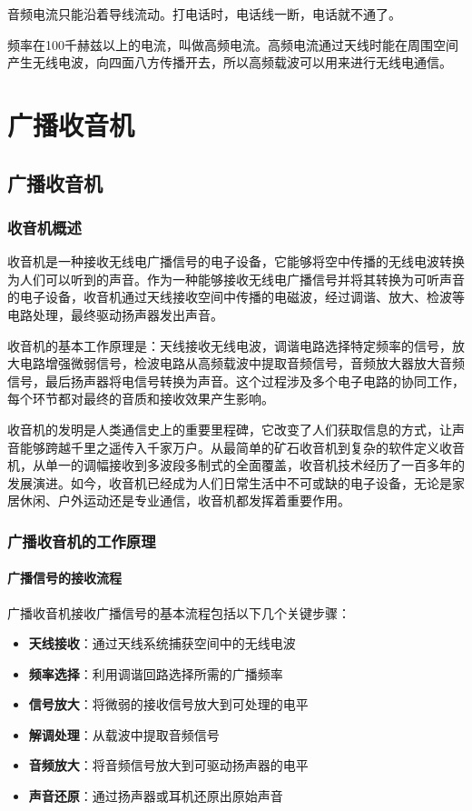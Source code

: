 \documentclass[12pt,UTF8]{ctexbook}
\begin{document}
音频电流只能沿着导线流动。打电话时，电话线一断，电话就不通了。

频率在100千赫兹以上的电流，叫做高频电流。高频电流通过天线时能在周围空间产生无线电波，向四面八方传播开去，所以高频载波可以用来进行无线电通信。

\part{广播收音机}

\chapter{广播收音机}

\section{收音机概述}

收音机是一种接收无线电广播信号的电子设备，它能够将空中传播的无线电波转换为人们可以听到的声音。作为一种能够接收无线电广播信号并将其转换为可听声音的电子设备，收音机通过天线接收空间中传播的电磁波，经过调谐、放大、检波等电路处理，最终驱动扬声器发出声音。

收音机的基本工作原理是：天线接收无线电波，调谐电路选择特定频率的信号，放大电路增强微弱信号，检波电路从高频载波中提取音频信号，音频放大器放大音频信号，最后扬声器将电信号转换为声音。这个过程涉及多个电子电路的协同工作，每个环节都对最终的音质和接收效果产生影响。

收音机的发明是人类通信史上的重要里程碑，它改变了人们获取信息的方式，让声音能够跨越千里之遥传入千家万户。从最简单的矿石收音机到复杂的软件定义收音机，从单一的调幅接收到多波段多制式的全面覆盖，收音机技术经历了一百多年的发展演进。如今，收音机已经成为人们日常生活中不可或缺的电子设备，无论是家居休闲、户外运动还是专业通信，收音机都发挥着重要作用。

\section{广播收音机的工作原理}

\subsection{广播信号的接收流程}

广播收音机接收广播信号的基本流程包括以下几个关键步骤：

\begin{itemize}[leftmargin=3.5em]
    \item \textbf{天线接收}：通过天线系统捕获空间中的无线电波
    \item \textbf{频率选择}：利用调谐回路选择所需的广播频率
    \item \textbf{信号放大}：将微弱的接收信号放大到可处理的电平
    \item \textbf{解调处理}：从载波中提取音频信号
    \item \textbf{音频放大}：将音频信号放大到可驱动扬声器的电平
    \item \textbf{声音还原}：通过扬声器或耳机还原出原始声音
\end{itemize}
\end{document}
